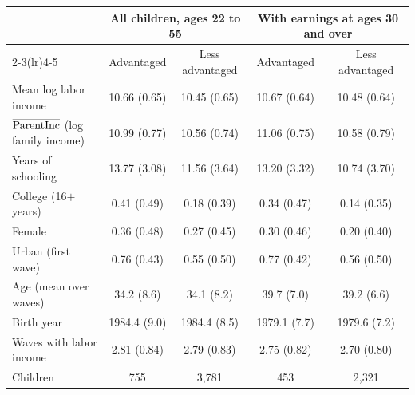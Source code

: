 \setlength{\tabcolsep}{5pt}
\begin{tabular}{@{}lcccc@{}}
\toprule
& \multicolumn{2}{c}{All children, ages 22 to 55} & \multicolumn{2}{c}{With earnings at ages 30 and over} \\
\cmidrule(lr){2-3}\cmidrule(lr){4-5}
& Advantaged & Less advantaged & Advantaged & Less advantaged \\
\midrule
Mean log labor income & 10.66 (0.65) & 10.45 (0.65) & 10.67 (0.64) & 10.48 (0.64) \\
$\overline{\mathrm{ParentInc}}$ (log family income) & 10.99 (0.77) & 10.56 (0.74) & 11.06 (0.75) & 10.58 (0.79) \\
Years of schooling & 13.77 (3.08) & 11.56 (3.64) & 13.20 (3.32) & 10.74 (3.70) \\
College (16$+$ years) & 0.41 (0.49) & 0.18 (0.39) & 0.34 (0.47) & 0.14 (0.35) \\
Female & 0.36 (0.48) & 0.27 (0.45) & 0.30 (0.46) & 0.20 (0.40) \\
Urban (first wave) & 0.76 (0.43) & 0.55 (0.50) & 0.77 (0.42) & 0.56 (0.50) \\
Age (mean over waves) & 34.2 (8.6) & 34.1 (8.2) & 39.7 (7.0) & 39.2 (6.6) \\
Birth year & 1984.4 (9.0) & 1984.4 (8.5) & 1979.1 (7.7) & 1979.6 (7.2) \\
Waves with labor income & 2.81 (0.84) & 2.79 (0.83) & 2.75 (0.82) & 2.70 (0.80) \\
\addlinespace
Children & 755 & 3,781 & 453 & 2,321 \\
\bottomrule
\end{tabular}
